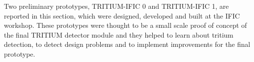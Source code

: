 Two preliminary prototypes, TRITIUM-IFIC 0 and TRITIUM-IFIC 1, are reported in this section, which were designed, developed and built at the IFIC workshop. These prototypes were thought to be a small scale proof of concept  of the final TRITIUM detector module and they helped to learn about tritium detection, to detect design problems and to implement improvements for the final prototype.